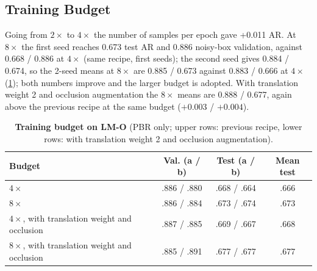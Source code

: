 \subsection{Training Budget}
\label{sec:acc:budget}
Going from $2\times$ to $4\times$ the number of samples per epoch gave +0.011 AR. At $8\times$
the first seed reaches 0.673 test AR and 0.886 noisy-box validation, against 0.668 / 0.886 at
$4\times$ (same recipe, first seeds); the second seed gives 0.884 / 0.674, so the 2-seed means at $8\times$ are 0.885 / 0.673 against 0.883 / 0.666 at $4\times$ (\cref{tab:acc_budget}); both numbers improve and the larger budget is adopted. With translation weight 2 and occlusion
augmentation the $8\times$ means are 0.888 / 0.677, again above the previous recipe at the same
budget ($+0.003$ / $+0.004$).
\begin{table}[t]
  \centering
  \small
  \begin{tabular}{@{}lccc@{}}
    \toprule
    Budget & Val. (a / b) & Test (a / b) & Mean test \\
    \midrule
    $4\times$ & .886 / .880 & .668 / .664 & .666 \\
    $8\times$ & .886 / .884 & .673 / .674 & .673 \\
    \midrule
    $4\times$, with translation weight and occlusion & .887 / .885 & .669 / .667 & .668 \\
    $8\times$, with translation weight and occlusion & .885 / .891 & .677 / .677 & .677 \\
    \bottomrule
  \end{tabular}
  \caption{\textbf{Training budget on LM-O} (PBR only; upper rows: previous recipe, lower rows: with translation weight 2 and occlusion augmentation).}
  \label{tab:acc_budget}
\end{table}

